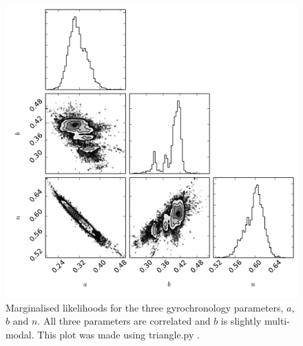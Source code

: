 \documentclass[useAMS, usenatbib]{mn2e}
\begin{document}
\begin{figure}
\begin{center}
\includegraphics[width=6in, clip=false, trim=0 0 0.5in 0]{small_triangleACHF45.pdf}
\caption{Marginalised likelihoods for the three gyrochronology
parameters, $a$, $b$ and $n$. All three parameters are correlated and $b$ is
slightly multi-modal. This plot was made using triangle.py
\citep{Foreman-Mackey_triangle}.
\label{fig:triangle}}
\end{center}
\end{figure}
\end{document}
